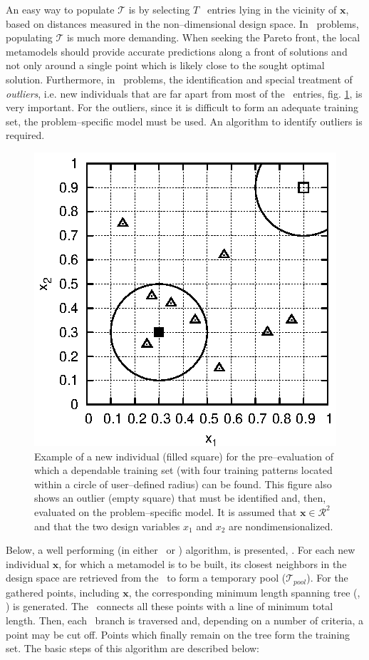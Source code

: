 \documentclass{vki_ls}
\newcommand{\vect}[1]{\bm{#1}}
\newcommand{\set}[1]{\mathcal{#1}}
\begin{document}
An easy way to populate $\set{T}$ is by selecting $T$ \DB\ entries lying in the vicinity of $\vect{x}$, based on distances measured in the non--dimensional design space. 
In \MOO\ problems, populating $\set{T}$ is much more demanding.
When seeking the Pareto front, the local metamodels should provide accurate predictions along a front of solutions and not only around a single point which is likely close to the sought optimal solution.
Furthermore, in \MOO\ problems, the identification and special treatment of \emph{outliers}, i.e. new individuals that are far apart from most of the \DB\ entries, fig. \ref{tps:tps_example}, is very important.
For the outliers, since it is difficult to form an adequate training set, the problem--specific model must be used. 
An algorithm to identify outliers is required.
%
\begin{figure}[h!]
    \centering
    \includegraphics[scale=1.0]{tpsExample.eps}
    \caption{Example of a new individual (filled square) for the
	pre--evaluation of which a dependable training set (with four
	training patterns located within a circle of user--defined radius)
	can be found. This figure also shows an outlier (empty square) that
	must be identified and, then, evaluated on the
 	problem--specific model. It is assumed that $\vect{x}\!\in\!\set{R}^2$
	and that the two design variables $x_1$ and $x_2$ are 
	nondimensionalized.}
    \label{tps:tps_example}
\end{figure}
%

Below, a well performing (in either \SOO\ or \MOO) algorithm, is presented, \cite{LTT_2_029}. 
For each new individual $\vect{x}$, for which a metamodel is to be built, its closest neighbors in the design space are retrieved from the \DB\ to form a temporary pool ($\set{T}_{pool}$).
For the gathered points, including $\vect{x}$, the corresponding minimum length spanning tree (\MST, \cite{Knu97}) is generated. The \MST\ connects all these points with a line of minimum total length. 
Then, each \MST\ branch is traversed and, depending on a number of criteria, a point may be cut off.
Points which finally remain on the tree form the training set. 
The basic steps of this algorithm are described below:
\end{document}
